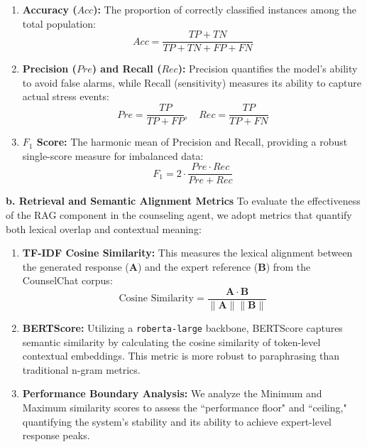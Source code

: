 \documentclass[journal,twoside,web]{ieeecolor}
\begin{document}
\begin{enumerate}
    \item \textbf{Accuracy ($Acc$):} The proportion of correctly classified instances among the total population:
    \begin{equation}
        Acc = \frac{TP + TN}{TP + TN + FP + FN}
    \end{equation}

    \item \textbf{Precision ($Pre$) and Recall ($Rec$):} Precision quantifies the model's ability to avoid false alarms, while Recall (sensitivity) measures its ability to capture actual stress events:
    \begin{equation}
        Pre = \frac{TP}{TP + FP}, \quad Rec = \frac{TP}{TP + FN}
    \end{equation}

    \item \textbf{$F_1$ Score:} The harmonic mean of Precision and Recall, providing a robust single-score measure for imbalanced data:
    \begin{equation}
        F_1 = 2 \cdot \frac{Pre \cdot Rec}{Pre + Rec}
    \end{equation}
\end{enumerate}

\textbf{b. Retrieval and Semantic Alignment Metrics}
To evaluate the effectiveness of the RAG component in the counseling agent, we adopt metrics that quantify both lexical overlap and contextual meaning:

\begin{enumerate}
    \item \textbf{TF-IDF Cosine Similarity:} This measures the lexical alignment between the generated response ($\mathbf{A}$) and the expert reference ($\mathbf{B}$) from the CounselChat corpus:
    \begin{equation}
        \text{Cosine Similarity} = \frac{\mathbf{A} \cdot \mathbf{B}}{\|\mathbf{A}\| \|\mathbf{B}\|}
    \end{equation}

    \item \textbf{BERTScore\cite{zhang2019bertscore}:} Utilizing a \texttt{roberta-large} backbone, BERTScore captures semantic similarity by calculating the cosine similarity of token-level contextual embeddings. This metric is more robust to paraphrasing than traditional n-gram metrics.

    \item \textbf{Performance Boundary Analysis:} We analyze the Minimum and Maximum similarity scores to assess the ``performance floor" and ``ceiling," quantifying the system's stability and its ability to achieve expert-level response peaks.
\end{enumerate}
\end{document}
